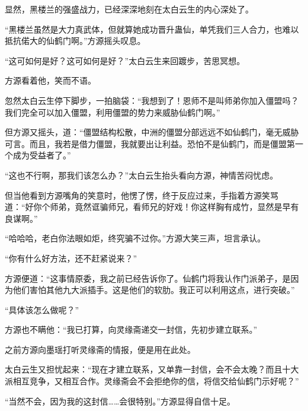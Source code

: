 \begin{this_body}
显然，黑楼兰的强盛战力，已经深深地刻在太白云生的内心深处了。

“黑楼兰虽然是大力真武体，但就算她成功晋升蛊仙，单凭我们三人合力，也难以抵抗偌大的仙鹤门啊。”方源摇头叹息。

“这可如何是好？这可如何是好？”太白云生来回踱步，苦思冥想。

方源看着他，笑而不语。

忽然太白云生停下脚步，一拍脑袋：“我想到了！恩师不是叫师弟你加入僵盟吗？我们完全可以加入僵盟，利用僵盟的势力来威胁仙鹤门啊。”

但方源又摇头，道：“僵盟结构松散，中洲的僵盟分部远远不如仙鹤门，毫无威胁可言。而且，我若是借力僵盟，我就要出让利益。恐怕不是仙鹤门，而是僵盟第一个成为受益者了。”

“这也不行啊，那我们该怎么办？”太白云生抬头看向方源，神情苦闷忧虑。

但当他看到方源嘴角的笑意时，他愣了愣，终于反应过来，手指着方源笑骂道：“好你个师弟，竟然诓骗师兄，看师兄的好戏！你这样胸有成竹，显然是早有良谋啊。”

“哈哈哈，老白你法眼如炬，终究骗不过你。”方源大笑三声，坦言承认。

“你有什么好方法，还不赶紧说来？”

方源便道：“这事情原委，我之前已经告诉你了。仙鹤门将我认作门派弟子，是因为他们害怕其他九大派插手。这是他们的软肋。我正可以利用这点，进行突破。”

“具体该怎么做呢？”

方源也不瞒他：“我已打算，向灵缘斋递交一封信，先初步建立联系。”

之前方源向墨瑶打听灵缘斋的情报，便是用在此处。

太白云生又担忧起来：“现在才建立联系，又单靠一封信，会不会太晚？而且十大派相互竞争，又相互合作。灵缘斋会不会拒绝你的信，将信交给仙鹤门示好呢？”

“当然不会，因为我的这封信……会很特别。”方源显得自信十足。

\end{this_body}

